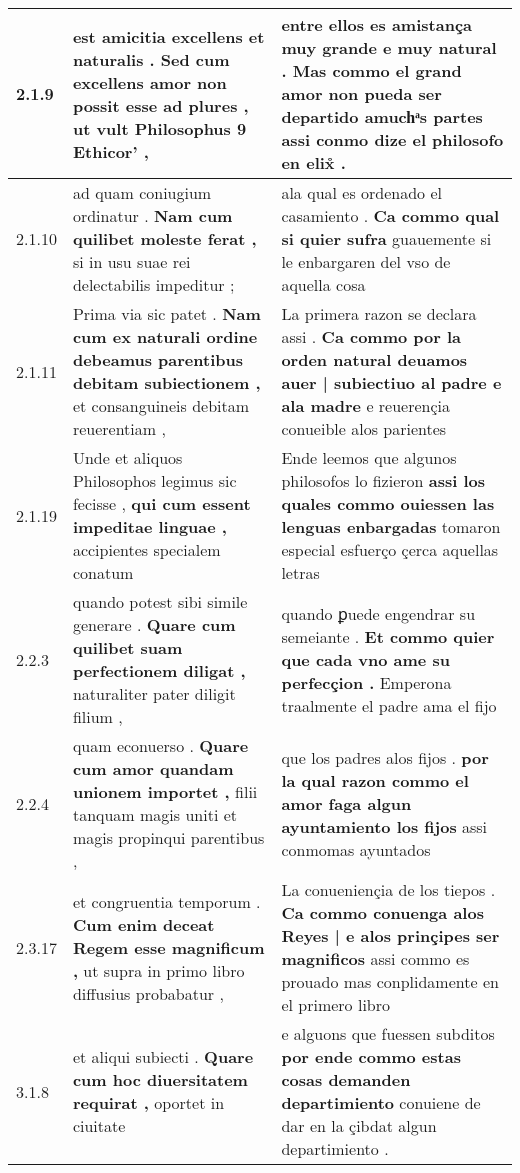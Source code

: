 \begin{tabular}{|p{1cm}|p{6.5cm}|p{6.5cm}|}
2.1.9 & est amicitia excellens et naturalis . \textbf{ Sed cum excellens amor non possit esse ad plures , } ut vult Philosophus 9 Ethicor’ , & entre ellos es amistança muy grande e muy natural . \textbf{ Mas commo el grand amor non pueda ser departido amuchͣs partes } assi conmo dize el philosofo en elix̊ . \\\hline
2.1.10 & ad quam coniugium ordinatur . \textbf{ Nam cum quilibet moleste ferat , } si in usu suae rei delectabilis impeditur ; & ala qual es ordenado el casamiento . \textbf{ Ca commo qual si quier sufra } guauemente si le enbargaren del vso de aquella cosa \\\hline
2.1.11 & Prima via sic patet . \textbf{ Nam cum ex naturali ordine debeamus parentibus debitam subiectionem , } et consanguineis debitam reuerentiam , & La primera razon se declara assi . \textbf{ Ca commo por la orden natural deuamos auer | subiectiuo al padre e ala madre } e reuerençia conueible alos parientes \\\hline
2.1.19 & Unde et aliquos Philosophos legimus sic fecisse , \textbf{ qui cum essent impeditae linguae , } accipientes specialem conatum & Ende leemos que algunos philosofos lo fizieron \textbf{ assi los quales commo ouiessen las lenguas enbargadas } tomaron especial esfuerço çerca aquellas letras \\\hline
2.2.3 & quando potest sibi simile generare . \textbf{ Quare cum quilibet suam perfectionem diligat , } naturaliter pater diligit filium , & quando ꝑuede engendrar su semeiante . \textbf{ Et commo quier que cada vno ame su perfecçion . } Emperona traalmente el padre ama el fijo \\\hline
2.2.4 & quam econuerso . \textbf{ Quare cum amor quandam unionem importet , } filii tanquam magis uniti et magis propinqui parentibus , & que los padres alos fijos . \textbf{ por la qual razon commo el amor faga algun ayuntamiento los fijos } assi conmomas ayuntados \\\hline
2.3.17 & et congruentia temporum . \textbf{ Cum enim deceat Regem esse magnificum , } ut supra in primo libro diffusius probabatur , & La conueniençia de los tiepos . \textbf{ Ca commo conuenga alos Reyes | e alos prinçipes ser magnificos } assi commo es prouado mas conplidamente en el primero libro \\\hline
3.1.8 & et aliqui subiecti . \textbf{ Quare cum hoc diuersitatem requirat , } oportet in ciuitate & e alguons que fuessen subditos \textbf{ por ende commo estas cosas demanden departimiento } conuiene de dar en la çibdat algun departimiento . \\\hline

\end{tabular}
